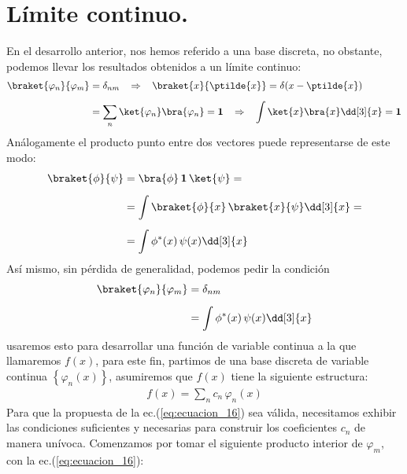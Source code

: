 \section{Límite continuo.}

En el desarrollo anterior, nos hemos referido a una base discreta, no obstante, podemos llevar los resultados obtenidos a un límite continuo:
\begin{align}
\begin{aligned}[b]
\braket{\varphi_{n}}{\varphi_{m}} &= \delta_{nm} \hspace{0.3cm} \Rightarrow \hspace{0.3cm} \braket{x}{\ptilde{x}} = \delta(x - \ptilde{x}) \\[0.5em]
&= \sum_{n} \ket{\varphi_{n}} \bra{\varphi_{n}} = \mathbf{1} \hspace{0.3cm} \Rightarrow \hspace{0.3cm} \int \ket{x} \bra{x} \dd[3]{x} = \mathbf{1}
\end{aligned}
\label{eq:ecuacion_14}
\end{align}
Análogamente el producto punto entre dos vectores puede representarse de este modo:
\begin{align}
\begin{aligned}[b]
\braket{\phi}{\psi} &= \bra{\phi} \, \mathbf{1} \, \ket{\psi} = \\[0.5em]
&= \int \braket{\phi}{x} \, \braket{x}{\psi} \dd[3]{x} = \\[0.5em]
&= \int \phi^{*}(x) \, \psi (x) \dd[3]{x}
\end{aligned}
\label{eq:ecuacion_15}
\end{align}
Así mismo, sin pérdida de generalidad, podemos pedir la condición
\begin{align*}
\braket{\varphi_{n}}{\varphi_{m}} &= \delta_{nm} \\[0.5em]
&= \int \phi^{*}(x) \, \psi (x) \dd[3]{x}
\end{align*}
usaremos esto para desarrollar una función de variable continua a la que llamaremos $f(x)$, para este fin, partimos de una base discreta de variable continua $\left\{ \varphi_{n}(x) \right\}$, asumiremos que $f(x)$ tiene la siguiente estructura:
\begin{align}
f(x) = \sum_{n} c_{n} \, \varphi_{n}(x)
\label{eq:ecuacion_16}
\end{align}
Para que la propuesta de la ec.(\ref{eq:ecuacion_16}) sea válida, necesitamos exhibir las condiciones suficientes y necesarias para construir los coeficientes $c_{n}$ de manera unívoca. Comenzamos por tomar el siguiente producto interior de $\varphi_{m}$, con la ec.(\ref{eq:ecuacion_16}):
